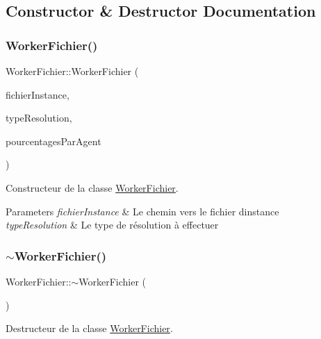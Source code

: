 \subsection{Constructor \& Destructor Documentation}
\mbox{\label{classWorkerFichier_addb7f9e5fa891620d9a048cdd77559c2}} 
\subsubsection{\texorpdfstring{Worker\+Fichier()}{WorkerFichier()}}
{\footnotesize\ttfamily Worker\+Fichier\+::\+Worker\+Fichier (\begin{DoxyParamCaption}\item[{Q\+String}]{fichier\+Instance,  }\item[{Q\+String}]{type\+Resolution,  }\item[{map$<$ unsigned int, unsigned int $>$}]{pourcentages\+Par\+Agent }\end{DoxyParamCaption})}



Constructeur de la classe \hyperlink{classWorkerFichier}{Worker\+Fichier}. 


\begin{DoxyParams}{Parameters}
{\em fichier\+Instance} & Le chemin vers le fichier d\textquotesingle{}instance \\
\hline
{\em type\+Resolution} & Le type de résolution à effectuer \\
\hline
\end{DoxyParams}
\mbox{\label{classWorkerFichier_acabdd12b795f6b7f656e0ed9e61cb6ca}} 
\subsubsection{\texorpdfstring{$\sim$\+Worker\+Fichier()}{~WorkerFichier()}}
{\footnotesize\ttfamily Worker\+Fichier\+::$\sim$\+Worker\+Fichier (\begin{DoxyParamCaption}{ }\end{DoxyParamCaption})}



Destructeur de la classe \hyperlink{classWorkerFichier}{Worker\+Fichier}. 




